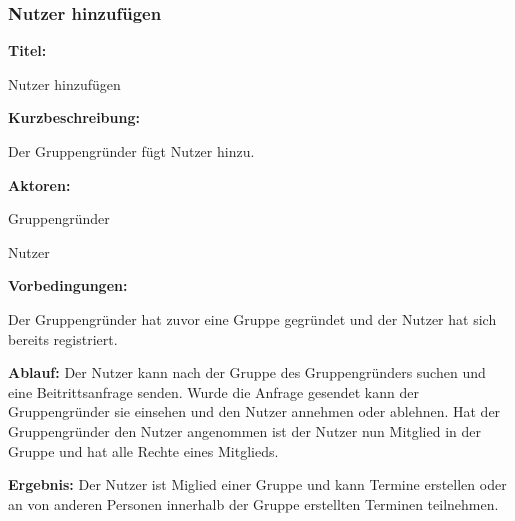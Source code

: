 \documentclass{scrartcl}
\begin{document}
	\subsubsection{Nutzer hinzufügen}
	\begin{description}
		\item \textbf{Titel:}
		\begin{description}
			\item Nutzer hinzufügen
		\end{description}
		\item \textbf{Kurzbeschreibung:}
		\begin{description}
			\item Der Gruppengründer fügt Nutzer hinzu.
		\end{description}
		\item \textbf{Aktoren:}
		\begin{description}
			\item Gruppengründer
			\item Nutzer
		\end{description}
		\item \textbf{Vorbedingungen:}
		\begin{description}
			\item Der Gruppengründer hat zuvor eine Gruppe gegründet und der Nutzer hat sich bereits registriert.
		\end{description}
		\item \textbf{Ablauf:} \newline Der Nutzer kann nach der Gruppe des Gruppengründers suchen und eine Beitrittsanfrage senden. Wurde die Anfrage gesendet kann der Gruppengründer sie einsehen und den Nutzer annehmen oder ablehnen. Hat der Gruppengründer den Nutzer angenommen ist der Nutzer nun Mitglied in der Gruppe und hat alle Rechte eines Mitglieds.
		\item \textbf{Ergebnis:} \newline Der Nutzer ist Miglied einer Gruppe und kann Termine erstellen oder an von anderen Personen innerhalb der Gruppe erstellten Terminen teilnehmen.
	\end{description}
	
	\newpage
	
\end{document}
